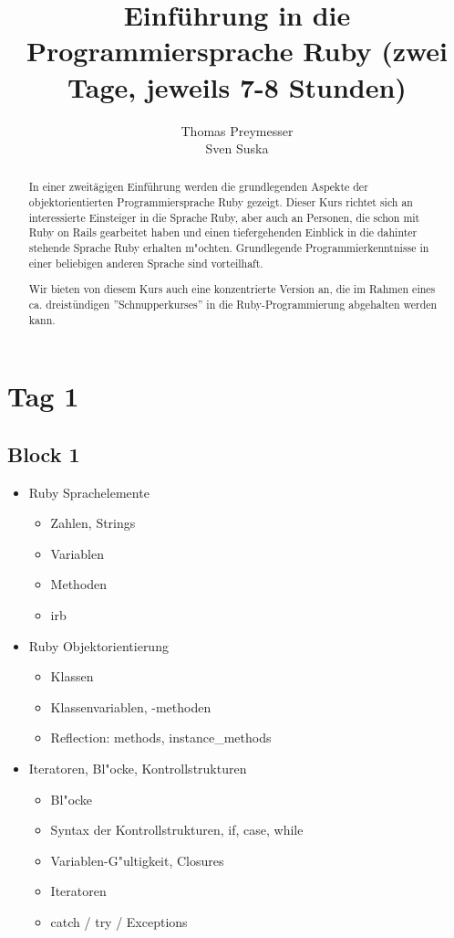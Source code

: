 \documentclass[a4paper,10pt]{article}
\title{Einführung in die Programmiersprache Ruby (zwei Tage, jeweils 7-8 Stunden)}
\author{Thomas Preymesser\\Sven Suska}
\begin{document}
\maketitle

\begin{abstract}
In einer zweitägigen Einführung werden die grundlegenden Aspekte der objektorientierten Programmiersprache Ruby gezeigt. 
Dieser Kurs richtet sich an interessierte Einsteiger in die Sprache Ruby, aber auch an Personen, die schon mit Ruby on Rails gearbeitet haben und einen tiefergehenden Einblick in die dahinter stehende Sprache Ruby erhalten m"ochten. 
Grundlegende Programmierkenntnisse in einer beliebigen anderen Sprache sind vorteilhaft.

Wir bieten von diesem Kurs auch eine konzentrierte Version an, die im Rahmen eines ca. dreistündigen ''Schnupperkurses'' in die Ruby-Programmierung abgehalten werden kann.
\end{abstract}

\section*{Tag 1}

\subsection*{Block 1}

\begin{itemize}
  \item Ruby Sprachelemente
  \begin{itemize}
    \item Zahlen, Strings
    \item Variablen
    \item Methoden
      \item irb
  \end{itemize}
  \item Ruby Objektorientierung
  \begin{itemize}
    \item Klassen
    \item Klassenvariablen, -methoden
    \item Reflection: methods, instance\_methods
  \end{itemize}
  \item Iteratoren, Bl"ocke, Kontrollstrukturen
  \begin{itemize}
    \item Bl"ocke
    \item Syntax der Kontrollstrukturen, if, case, while
    \item Variablen-G"ultigkeit, Closures
    \item Iteratoren
    \item catch / try / Exceptions
  \end{itemize}
\end{itemize}
\end{document}
